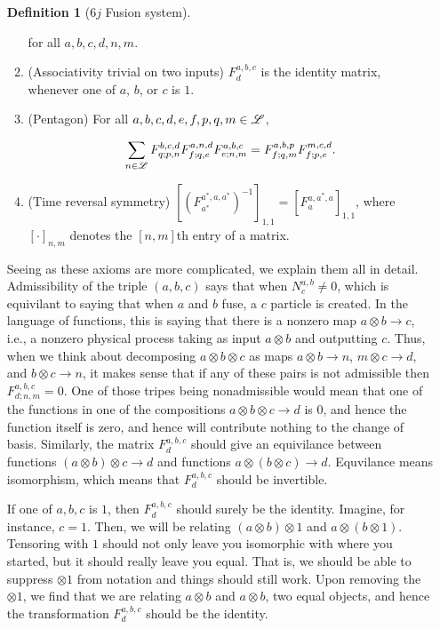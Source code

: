 \documentclass{article}
\theoremstyle{definition}
\newtheorem*{definition}{Definition}
\numberwithin{figure}{section}
\begin{document}
\begin{enumerate}[\thesection .1.]
\begin{definition}[$6j$ Fusion system]
\begin{enumerate}
for all $a,b,c,d,n,m$.

\item (Associativity trivial on two inputs) $F^{a,b,c}_{d}$ is the identity matrix, whenever one of $a$, $b$, or $c$ is $1$.

\item (Pentagon) For all $a,b,c,d,e,f,p,q,m\in\mathscr{L}$,

$$\sum_{n\in \mathscr{L}}F^{b,c,d}_{q;p,n}F^{a,n,d}_{f;q,e}F^{a,b,c}_{e;n,m}=F^{a,b,p}_{f; q,m}F^{m,c,d}_{f;p,e}.$$

\item (Time reversal symmetry) $\left[\left(F^{a^*,a,a^*}_{a^*}\right)^{-1}\right]_{1,1}=\left[F^{a,a^*,a}_{a}\right]_{1,1}$, where $\left[\cdot\right]_{n,m}$ denotes the $[n,m]$th entry of a matrix.
\end{enumerate}
\raggedleft\qedsymbol{}
\end{definition}

Seeing as these axioms are more complicated, we explain them all in detail. Admissibility of the triple $(a,b,c)$ says that when $N^{a,b}_{c}\neq 0$, which is equivilant to saying that when $a$ and $b$ fuse, a $c$ particle is created. In the language of functions, this is saying that there is a nonzero map $a\otimes b\to c$, i.e., a nonzero physical process taking as input $a\otimes b$ and outputting $c$.  Thus, when we think about decomposing $a\otimes b\otimes c$ as maps $a\otimes b\to n$, $m\otimes c\to d$, and $b\otimes c\to n$, it makes sense that if any of these pairs is not admissible then $F^{a,b,c}_{d;n,m}=0$. One of those tripes being nonadmissible would mean that one of the functions in one of the compositions $a\otimes b\otimes c\to d$ is $0$, and hence the function itself is zero, and hence will contribute nothing to the change of basis. Similarly, the matrix $F^{a,b,c}_{d}$ should give an equivilance between functions $(a\otimes b)\otimes c \to d$ and functions $a\otimes (b\otimes c)\to d$. Equvilance means isomorphism, which means that $F^{a,b,c}_{d}$ should be invertible.

If one of $a,b,c$ is $1$, then $F^{a,b,c}_{d}$ should surely be the identity. Imagine, for instance, $c=1$. Then, we will be relating $(a\otimes b)\otimes 1$ and $a \otimes (b\otimes 1)$. Tensoring with $1$ should not only leave you isomorphic with where you started, but it should really leave you equal. That is, we should be able to suppress $\otimes 1$ from notation and things should still work. Upon removing the $\otimes 1$, we find that we are relating $a\otimes b$ and $a\otimes b$, two equal objects, and hence the transformation $F^{a,b,c}_{d}$ should be the identity.


\end{enumerate}
\end{document}
